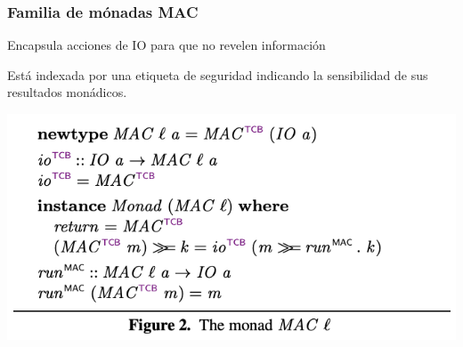 \documentclass{beamer}
\begin{document}
\begin{frame}
    \frametitle{Familia de mónadas MAC}
    Encapsula acciones de IO para que no revelen información\newline

    Está indexada por una etiqueta de seguridad indicando la sensibilidad de sus resultados monádicos.

    \begin{center}
        \includegraphics[scale=0.7]{figure2.png}
    \end{center}
\end{frame}
\end{document}
